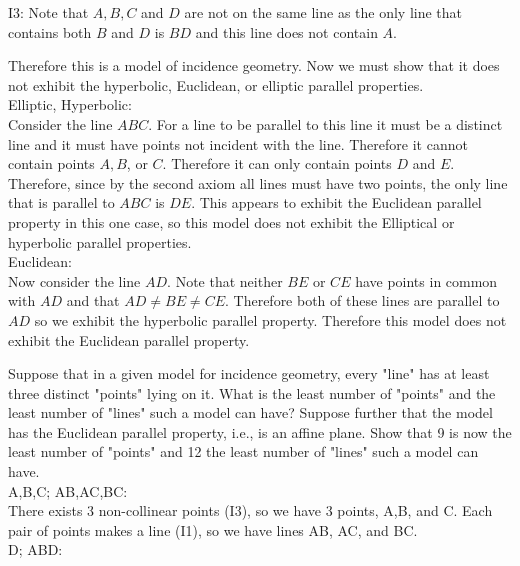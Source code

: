 \documentclass[12pt,letterpaper]{article}
\newcommand{\prob}[1]{\newpage\noindent {\bf #1}}
\begin{document}
\noindent I3: Note that $A, B, C$ and $D$ are not on the same line as the only line that contains both $B$ and $D$ is $BD$ and this line does not contain $A$.

Therefore this is a model of incidence geometry.  Now we must show that it does not exhibit the hyperbolic, Euclidean, or elliptic parallel properties.\\




\noindent Elliptic, Hyperbolic:\\

Consider the line $ABC$.  For a line to be parallel to this line it must be a distinct line and it must have points not incident with the line. Therefore it cannot contain points $A,B$, or $C$.  Therefore it can only contain points $D$ and $E$.  Therefore, since by the second axiom all lines must have two points, the only line that is parallel to $ABC$ is $DE$.  This appears to exhibit the Euclidean parallel property in this one case, so this model does not exhibit the Elliptical or hyperbolic parallel properties.  \\

\noindent Euclidean: \\

Now consider the line $AD$. Note that neither $BE$ or $CE$ have points in common with $AD$ and that $AD \neq BE \neq CE$.  Therefore both of these lines are parallel to $AD$ so we exhibit the hyperbolic parallel property.  Therefore this model does not exhibit the Euclidean parallel property.  






\prob{13} Suppose that in a given model for incidence geometry, every "line" has at least three distinct "points" lying on it.  What is the least number of "points" and the least number of "lines" such a model can have?  Suppose further that the model has the Euclidean parallel property, i.e., is an affine plane.  Show that 9 is now the least number of "points" and 12 the least number of "lines" such a model can have.\\
 
 
\noindent A,B,C; AB,AC,BC:\\

There exists 3 non-collinear points (I3), so we have 3 points, A,B, and C.  Each pair of points makes a line (I1), so we have lines AB, AC, and BC.  \\

\noindent D; ABD:\\
\end{document}
